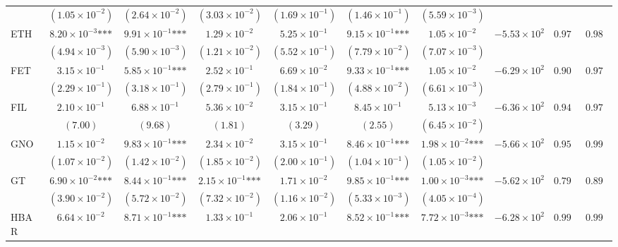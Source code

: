 \documentclass{article}
\begin{document}
\begin{landscape}
\begin{longtable}{lccccccccc}
 & $(1.05\times 10^{-2})$ & $(2.64\times 10^{-2})$ & $(3.03\times 10^{-2})$ & $(1.69\times 10^{-1})$ & $(1.46\times 10^{-1})$ & $(5.59\times 10^{-3})$ &  &  &  \\
ETH & $8.20\times 10^{-3}\text{***}$ & $9.91\times 10^{-1}\text{***}$ & $1.29\times 10^{-2}$ & $5.25\times 10^{-1}$ & $9.15\times 10^{-1}\text{***}$ & $1.05\times 10^{-2}$ & $-5.53\times 10^{2}$ & $0.970$ & $0.987$ \\
 & $(4.94\times 10^{-3})$ & $(5.90\times 10^{-3})$ & $(1.21\times 10^{-2})$ & $(5.52\times 10^{-1})$ & $(7.79\times 10^{-2})$ & $(7.07\times 10^{-3})$ &  &  &  \\
FET & $3.15\times 10^{-1}$ & $5.85\times 10^{-1}\text{***}$ & $2.52\times 10^{-1}$ & $6.69\times 10^{-2}$ & $9.33\times 10^{-1}\text{***}$ & $1.05\times 10^{-2}$ & $-6.29\times 10^{2}$ & $0.908$ & $0.977$ \\
 & $(2.29\times 10^{-1})$ & $(3.18\times 10^{-1})$ & $(2.79\times 10^{-1})$ & $(1.84\times 10^{-1})$ & $(4.88\times 10^{-2})$ & $(6.61\times 10^{-3})$ &  &  &  \\
FIL & $2.10\times 10^{-1}$ & $6.88\times 10^{-1}$ & $5.36\times 10^{-2}$ & $3.15\times 10^{-1}$ & $8.45\times 10^{-1}$ & $5.13\times 10^{-3}$ & $-6.36\times 10^{2}$ & $0.946$ & $0.976$ \\
 & $(7.00)$ & $(9.68)$ & $(1.81)$ & $(3.29)$ & $(2.55)$ & $(6.45\times 10^{-2})$ &  &  &  \\
GNO & $1.15\times 10^{-2}$ & $9.83\times 10^{-1}\text{***}$ & $2.34\times 10^{-2}$ & $3.15\times 10^{-1}$ & $8.46\times 10^{-1}\text{***}$ & $1.98\times 10^{-2}\text{***}$ & $-5.66\times 10^{2}$ & $0.952$ & $0.990$ \\
 & $(1.07\times 10^{-2})$ & $(1.42\times 10^{-2})$ & $(1.85\times 10^{-2})$ & $(2.00\times 10^{-1})$ & $(1.04\times 10^{-1})$ & $(1.05\times 10^{-2})$ &  &  &  \\
GT & $6.90\times 10^{-2}\text{***}$ & $8.44\times 10^{-1}\text{***}$ & $2.15\times 10^{-1}\text{***}$ & $1.71\times 10^{-2}$ & $9.85\times 10^{-1}\text{***}$ & $1.00\times 10^{-3}\text{***}$ & $-5.62\times 10^{2}$ & $0.793$ & $0.891$ \\
 & $(3.90\times 10^{-2})$ & $(5.72\times 10^{-2})$ & $(7.32\times 10^{-2})$ & $(1.16\times 10^{-2})$ & $(5.33\times 10^{-3})$ & $(4.05\times 10^{-4})$ &  &  &  \\
HBAR & $6.64\times 10^{-2}$ & $8.71\times 10^{-1}\text{***}$ & $1.33\times 10^{-1}$ & $2.06\times 10^{-1}$ & $8.52\times 10^{-1}\text{***}$ & $7.72\times 10^{-3}\text{***}$ & $-6.28\times 10^{2}$ & $0.990$ & $0.993$ \\

\end{longtable}
\end{landscape}
\end{document}

